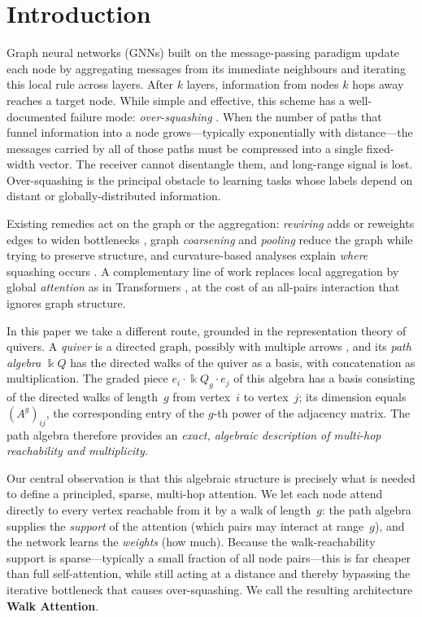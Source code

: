 \documentclass[runningheads]{llncs}
\newcommand{\kk}{\Bbbk}                 %
\newcommand{\kQ}{\kk Q}                 %
\newcommand{\Adj}{A}                    %
\begin{document}
\section{Introduction}

Graph neural networks (GNNs) built on the message-passing paradigm
\cite{gilmer2017neural} update each node by aggregating messages from its
immediate neighbours and iterating this local rule across layers. After $k$
layers, information from nodes $k$ hops away reaches a target node. While simple
and effective, this scheme has a well-documented failure mode:
\emph{over-squashing} \cite{alon2021bottleneck}. When the number of paths that
funnel information into a node grows---typically exponentially with
distance---the messages carried by all of those paths must be compressed into a
single fixed-width vector. The receiver cannot disentangle them, and long-range
signal is lost. Over-squashing is the principal obstacle to learning tasks whose
labels depend on distant or globally-distributed information.

Existing remedies act on the graph or the aggregation: \emph{rewiring} adds or
reweights edges to widen bottlenecks \cite{topping2022understanding}, graph
\emph{coarsening} and \emph{pooling} reduce the graph while trying to preserve
structure, and curvature-based analyses explain \emph{where} squashing occurs
\cite{digiovanni2023oversquashing}. A complementary line of work replaces local
aggregation by global \emph{attention} as in Transformers
\cite{vaswani2017attention}, at the cost of an all-pairs interaction that
ignores graph structure.

In this paper we take a different route, grounded in the representation theory of
quivers. A \emph{quiver} is a directed graph, possibly with multiple arrows
\cite{schiffler2014quiver,assem2006elements}, and its \emph{path algebra} $\kQ$
has the directed walks of the quiver as a basis, with concatenation as
multiplication. The graded piece $e_i \cdot \kQ_g \cdot e_j$ of this algebra has
a basis consisting of the directed walks of length~$g$ from vertex~$i$ to
vertex~$j$; its dimension equals $(\Adj^g)_{ij}$, the corresponding entry of the
$g$-th power of the adjacency matrix. The path algebra therefore provides an
\emph{exact, algebraic description of multi-hop reachability and multiplicity}.

Our central observation is that this algebraic structure is precisely what is
needed to define a principled, sparse, multi-hop attention. We let each node
attend directly to every vertex reachable from it by a walk of length~$g$: the
path algebra supplies the \emph{support} of the attention (which pairs may
interact at range~$g$), and the network learns the \emph{weights} (how much).
Because the walk-reachability support is sparse---typically a small fraction of
all node pairs---this is far cheaper than full self-attention, while still acting
at a distance and thereby bypassing the iterative bottleneck that causes
over-squashing. We call the resulting architecture \textbf{Walk Attention}.
\end{document}
